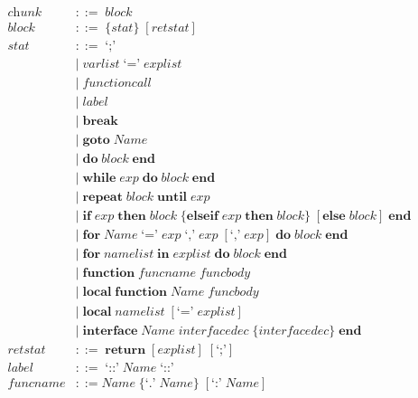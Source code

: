 \allowdisplaybreaks
\begin{align*}
\textit{chunk} & ::= \; \textit{block}\\
\textit{block} & ::= \; \{\textit{stat}\} \; [\textit{retstat}]\\
\textit{stat} & ::= \; \texttt{`;'}\\
& | \; \textit{varlist} \; \texttt{`='} \; \textit{explist}\\
& | \; \textit{functioncall}\\
& | \; \textit{label}\\
& | \; \textbf{break}\\ 
& | \; \textbf{goto} \; \textit{Name}\\
& | \; \textbf{do} \; \textit{block} \; \textbf{end}\\
& | \; \textbf{while} \; \textit{exp} \; \textbf{do} \; \textit{block} \; \textbf{end}\\
& | \; \textbf{repeat} \; \textit{block} \; \textbf{until} \; \textit{exp}\\
& | \; \textbf{if} \; \textit{exp} \; \textbf{then} \; \textit{block} \;
  \{\textbf{elseif} \; \textit{exp} \; \textbf{then} \; \textit{block}\} \;
  [\textbf{else} \; \textit{block}] \; \textbf{end}\\ 
& | \; \textbf{for} \; \textit{Name} \; \texttt{`='} \; \textit{exp} \;
  \texttt{`,'} \; \textit{exp} \; [\texttt{`,'} \; \textit{exp}] \;
  \textbf{do} \; \textit{block} \; \textbf{end}\\
& | \; \textbf{for} \; \textit{namelist} \; \textbf{in} \; \textit{explist} \;
  \textbf{do} \; \textit{block} \; \textbf{end}\\
& | \; \textbf{function} \; \textit{funcname} \; \textit{funcbody}\\
& | \; \textbf{local} \; \textbf{function} \; \textit{Name} \; \textit{funcbody}\\
& | \; \textbf{local} \; \textit{namelist} \; [\texttt{`='} \; \textit{explist}]\\
& | \; \textbf{interface} \; \textit{Name} \; \textit{interfacedec} \;
  \{\textit{interfacedec}\} \; \textbf{end}\\
\textit{retstat} & ::= \; \textbf{return} \; [\textit{explist}] \; [\texttt{`;'}]\\
\textit{label} & ::= \; \texttt{`::'} \; \textit{Name} \; \texttt{`::'}\\
\textit{funcname} & ::= \textit{Name} \; \{\texttt{`.'} \; \textit{Name}\} \; [\texttt{`:'} \; \textit{Name}]\\

\end{align*}
